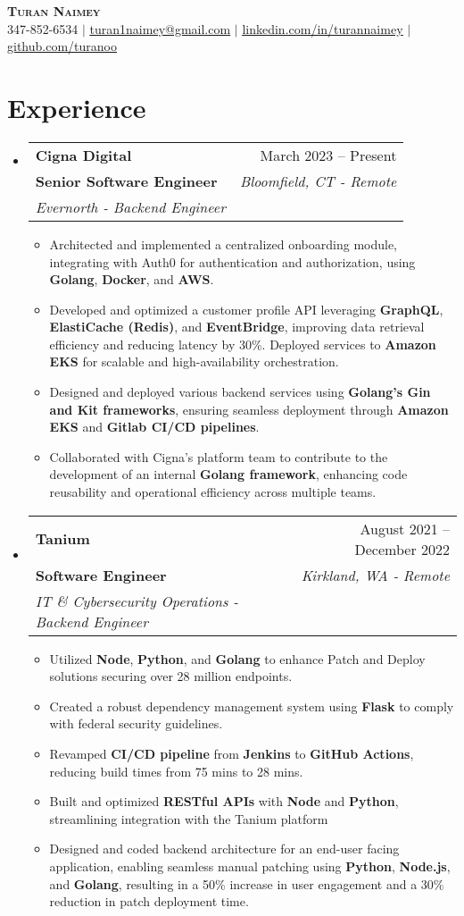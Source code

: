 \documentclass[letterpaper,11pt]{article}
\makeatletter
\newcommand{\resumeItem}[1]{
  \item\small{
    {#1 \vspace{-2pt}}
  }
}
\newcommand{\resumeSubheading}[5]{
  \vspace{-2pt}\item
    \begin{tabular*}{0.97\textwidth}[t]{l@{\extracolsep{\fill}}r}
      \textbf{#1} & #2 \\
      \textbf{\small#3} & \textit{\small #4} \\
      \textit{\small#5} \\
    \end{tabular*}\vspace{-7pt}
}
\newcommand{\resumeSubHeadingListStart}{\begin{itemize}[leftmargin=0.15in, label={}]}
\newcommand{\resumeSubHeadingListEnd}{\end{itemize}}
\newcommand{\resumeItemListStart}{\begin{itemize}}
\newcommand{\resumeItemListEnd}{\end{itemize}\vspace{-5pt}}
\makeatother
\begin{document}
\begin{center}
 \textbf{\Huge \scshape Turan Naimey} \\ \vspace{1pt}
 \small 347-852-6534 $|$ \href{mailto:turan1naimey@gmail.com}{\underline{turan1naimey@gmail.com}} $|$
 \href{https://linkedin.com/in/turannaimey}{\underline{linkedin.com/in/turannaimey}} $|$
 \href{https://github.com/turanoo}{\underline{github.com/turanoo}}
\end{center}

\section{Experience}

\resumeSubHeadingListStart
\resumeSubheading
{Cigna Digital}{March 2023 -- Present}
{Senior Software Engineer}{Bloomfield, CT - Remote}
{Evernorth - Backend Engineer}
\resumeItemListStart
\resumeItem{Architected and implemented a centralized onboarding module, integrating with Auth0 for authentication and authorization, using \textbf{Golang}, \textbf{Docker}, and \textbf{AWS}.}
\resumeItem{Developed and optimized a customer profile API leveraging \textbf{GraphQL}, \textbf{ElastiCache (Redis)}, and \textbf{EventBridge}, improving data retrieval efficiency and reducing latency by 30\%. Deployed services to \textbf{Amazon EKS} for scalable and high-availability orchestration.}
\resumeItem{Designed and deployed various backend services using \textbf{Golang’s Gin and Kit frameworks}, ensuring seamless deployment through \textbf{Amazon EKS} and \textbf{Gitlab CI/CD pipelines}.}
\resumeItem{Collaborated with Cigna’s platform team to contribute to the development of an internal \textbf{Golang framework}, enhancing code reusability and operational efficiency across multiple teams.}
\resumeItemListEnd
\resumeSubHeadingListEnd


\resumeSubHeadingListStart
\resumeSubheading
{Tanium}{August 2021 -- December 2022}
{Software Engineer}{Kirkland, WA - Remote}
{IT \& Cybersecurity Operations - Backend Engineer}
\resumeItemListStart
\resumeItem{Utilized \textbf{Node}, \textbf{Python}, and \textbf{Golang} to enhance Patch and Deploy solutions securing over 28 million endpoints.}
\resumeItem{Created a robust dependency management system using \textbf{Flask} to comply with federal security guidelines.}
\resumeItem{Revamped \textbf{CI/CD pipeline} from \textbf{Jenkins} to \textbf{GitHub Actions}, reducing build times from 75 mins to 28 mins.}
\resumeItem{Built and optimized \textbf{RESTful APIs} with \textbf{Node} and \textbf{Python}, streamlining integration with the Tanium platform}
\resumeItem{Designed and coded backend architecture for an end-user facing application, enabling seamless manual patching using \textbf{Python}, \textbf{Node.js}, and \textbf{Golang}, resulting in a 50\% increase in user engagement and a 30\% reduction in patch deployment time.}
\resumeItemListEnd
\resumeSubHeadingListEnd
\end{document}
